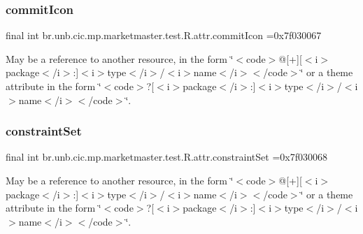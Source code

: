 \subsubsection{\texorpdfstring{commit\+Icon}{commitIcon}}
{\footnotesize\ttfamily final int br.\+unb.\+cic.\+mp.\+marketmaster.\+test.\+R.\+attr.\+commit\+Icon =0x7f030067\hspace{0.3cm}{\ttfamily [static]}}

May be a reference to another resource, in the form \char`\"{}$<$code$>$@\mbox{[}+\mbox{]}\mbox{[}$<$i$>$package$<$/i$>$\+:\mbox{]}$<$i$>$type$<$/i$>$/$<$i$>$name$<$/i$>$$<$/code$>$\char`\"{} or a theme attribute in the form \char`\"{}$<$code$>$?\mbox{[}$<$i$>$package$<$/i$>$\+:\mbox{]}$<$i$>$type$<$/i$>$/$<$i$>$name$<$/i$>$$<$/code$>$\char`\"{}. \mbox{\label{classbr_1_1unb_1_1cic_1_1mp_1_1marketmaster_1_1test_1_1R_1_1attr_ad11a8933a3599c42dfe190e66bffb0f6}} 
\subsubsection{\texorpdfstring{constraint\+Set}{constraintSet}}
{\footnotesize\ttfamily final int br.\+unb.\+cic.\+mp.\+marketmaster.\+test.\+R.\+attr.\+constraint\+Set =0x7f030068\hspace{0.3cm}{\ttfamily [static]}}

May be a reference to another resource, in the form \char`\"{}$<$code$>$@\mbox{[}+\mbox{]}\mbox{[}$<$i$>$package$<$/i$>$\+:\mbox{]}$<$i$>$type$<$/i$>$/$<$i$>$name$<$/i$>$$<$/code$>$\char`\"{} or a theme attribute in the form \char`\"{}$<$code$>$?\mbox{[}$<$i$>$package$<$/i$>$\+:\mbox{]}$<$i$>$type$<$/i$>$/$<$i$>$name$<$/i$>$$<$/code$>$\char`\"{}. \mbox{\label{classbr_1_1unb_1_1cic_1_1mp_1_1marketmaster_1_1test_1_1R_1_1attr_aa886f136b39d669159dda460162d9f19}} 
